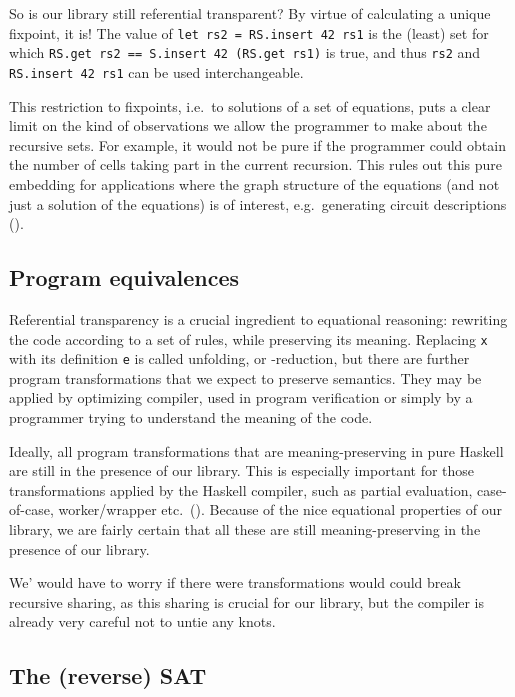 \documentclass[manuscript,screen,acmsmall]{acmart}
\begin{document}
So is our library still referential transparent? By virtue of calculating a unique fixpoint, it is!  The value of \verb|let rs2 = RS.insert 42 rs1| is the (least) set for which \verb|RS.get rs2 == S.insert 42 (RS.get rs1)| is true, and thus \verb|rs2| and \verb|RS.insert 42 rs1| can be used interchangeable.

This restriction to fixpoints, i.e.\ to solutions of a set of equations, puts a clear limit on the kind of observations we allow the programmer to make about the recursive sets. For example, it would not be pure if the programmer could obtain the number of cells taking part in the current recursion. This rules out this pure embedding for applications where the graph structure of the equations (and not just a solution of the equations) is of interest, e.g.\ generating circuit descriptions (\cite{circuits}).

\subsection{Program equivalences}

Referential transparency is a crucial ingredient to equational reasoning: rewriting the code according to a set of rules, while preserving its meaning. Replacing \verb|x| with its definition \verb|e| is called unfolding, or \textdelta-reduction, but there are further program transformations that we expect to preserve semantics.  They may be applied by optimizing compiler, used in program verification or simply by a programmer trying to understand the meaning of the code.

Ideally, all program transformations that are meaning-preserving in pure Haskell are still in the presence of our library. This is especially important for those transformations applied by the Haskell compiler, such as partial evaluation, case-of-case, worker/wrapper etc.\ (\cite{optimiser}). Because of the nice equational properties of our library, we are fairly certain that all these are still meaning-preserving in the presence of our library.

We’ would have to worry if there were transformations would could break recursive sharing, as this sharing is crucial for our library, but the compiler is already very careful not to untie any knots.

\subsection{The (reverse) SAT}\label{sec:sat}
\end{document}
